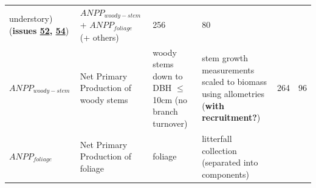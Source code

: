 \documentclass[]{article}
\begin{document}
\begin{longtable}[]{@{}llllll@{}}
\begin{minipage}[t]{0.13\columnwidth}
understory) (\textbf{issues
\href{https://github.com/forc-db/Global_Productivity/issues/52}{52},
\href{https://github.com/forc-db/Global_Productivity/issues/54}{54}})\strut
\end{minipage} & \begin{minipage}[t]{0.23\columnwidth}\raggedright\strut
\(ANPP_{woody-stem}\) + \(ANPP_{foliage}\) (+ others)\strut
\end{minipage} & \begin{minipage}[t]{0.07\columnwidth}\raggedright\strut
256\strut
\end{minipage} & \begin{minipage}[t]{0.07\columnwidth}\raggedright\strut
80\strut
\end{minipage}\tabularnewline
\begin{minipage}[t]{0.14\columnwidth}\raggedright\strut
\(ANPP_{woody-stem}\)\strut
\end{minipage} & \begin{minipage}[t]{0.19\columnwidth}\raggedright\strut
Net Primary Production of woody stems\strut
\end{minipage} & \begin{minipage}[t]{0.13\columnwidth}\raggedright\strut
woody stems down to DBH \(\le\) 10cm (no branch turnover)\strut
\end{minipage} & \begin{minipage}[t]{0.23\columnwidth}\raggedright\strut
stem growth measurements scaled to biomass using allometries
(\textbf{with recruitment?})\strut
\end{minipage} & \begin{minipage}[t]{0.07\columnwidth}\raggedright\strut
264\strut
\end{minipage} & \begin{minipage}[t]{0.07\columnwidth}\raggedright\strut
96\strut
\end{minipage}\tabularnewline
\begin{minipage}[t]{0.14\columnwidth}\raggedright\strut
\(ANPP_{foliage}\)\strut
\end{minipage} & \begin{minipage}[t]{0.19\columnwidth}\raggedright\strut
Net Primary Production of foliage\strut
\end{minipage} & \begin{minipage}[t]{0.13\columnwidth}\raggedright\strut
foliage\strut
\end{minipage} & \begin{minipage}[t]{0.23\columnwidth}\raggedright\strut
litterfall collection (separated into components)\strut

\end{minipage}
\end{longtable}
\end{document}
